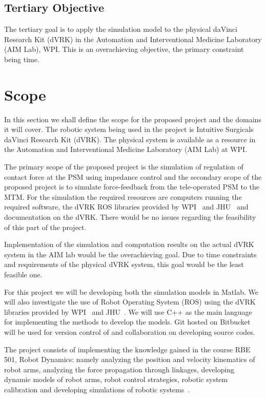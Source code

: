 \documentclass[10pt,journal,compsoc]{IEEEtran}
\begin{document}
\subsection{Tertiary Objective}
The tertiary goal is to apply the simulation model to the physical daVinci Research Kit (dVRK) in the Automation and Interventional Medicine Laboratory (AIM Lab), WPI. This is an overachieving objective, the primary constraint being time.

\section{Scope}
In this section we shall define the scope for the proposed project and the domains it will cover. 
The robotic system being used in the project is Intuitive Surgical\textquotesingle s daVinci Research Kit (dVRK). The physical system is available as a resource in the Automation and Interventional Medicine Laboratory (AIM Lab) at WPI. 

The primary scope of the proposed project is the simulation of regulation of contact force at the PSM using impedance control and the secondary scope of the proposed project is to simulate force-feedback from the tele-operated PSM to the MTM. For the simulation the required resources are computers running the required software, the dVRK ROS libraries provided by WPI~\cite{dvrkwpi} and JHU~\cite{dvrkjhu} and documentation on the dVRK. There would be no issues regarding the feasibility of this part of the project.

Implementation of the simulation and computation results on the actual dVRK system in the AIM lab would be the overachieving goal. Due to time constraints and requirements of the physical dVRK system, this goal would be the least feasible one.

For this project we will be developing both the simulation models in Matlab. We will also investigate the use of Robot Operating System (ROS) using the dVRK libraries provided by WPI~\cite{dvrkwpi} and JHU~\cite{dvrkjhu}. We will use C++ as the main language for implementing the methods to develop the models. Git hosted on Bitbucket~\cite{bitbucket} will be used for version control of and collaboration on developing source codes. 

The project consists of implementing the knowledge gained in the course RBE 501, Robot Dynamics: namely analyzing the position and velocity kinematics of robot arms, analyzing the force propagation through linkages, developing dynamic models of robot arms, robot control strategies, robotic system calibration and developing simulations of robotic systems~\cite{rbe501syl}. 
\end{document}
